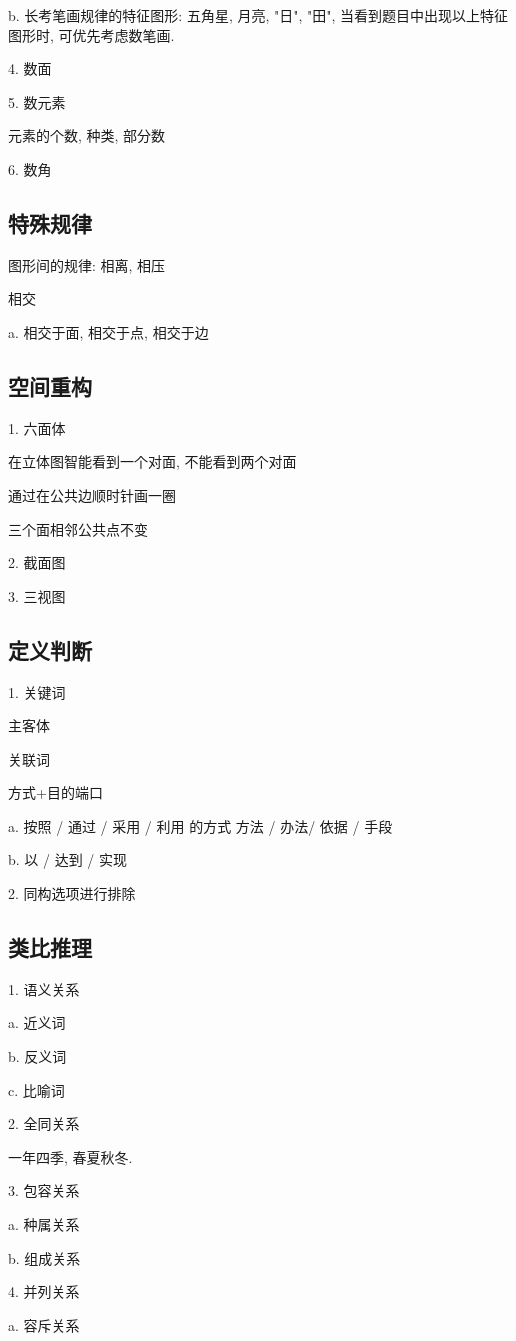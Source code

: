 \documentclass[UTF8]{ctexart}
\begin{document}
b. 长考笔画规律的特征图形: 五角星, 月亮, "日", "田", 当看到题目中出现以上特征图形时, 可优先考虑数笔画.

4. 数面

5. 数元素

元素的个数, 种类, 部分数

6. 数角
\subsection{特殊规律}

图形间的规律: 相离, 相压

相交

a. 相交于面, 相交于点, 相交于边

\subsection{空间重构}
1. 六面体

在立体图智能看到一个对面, 不能看到两个对面

通过在公共边顺时针画一圈

三个面相邻公共点不变

2. 截面图


3. 三视图

\subsection{定义判断}
1. 关键词

主客体

关联词

方式+目的端口

a. 按照 / 通过 / 采用 / 利用 的方式 方法 / 办法/ 依据 / 手段

b. 以 / 达到 / 实现

2. 同构选项进行排除

\subsection{类比推理}
1. 语义关系

a. 近义词

b. 反义词

c.  比喻词

2. 全同关系

一年四季, 春夏秋冬.

3. 包容关系

a. 种属关系

b. 组成关系

4. 并列关系

a. 容斥关系
\end{document}
